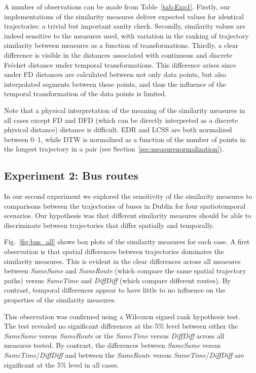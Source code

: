 \documentclass{interact}
\begin{document}
A number of observations can be made from Table~\ref{tab:Exp1}. Firstly, our implementations of the similarity measures deliver expected values for identical trajectories: a trivial but important sanity check. Secondly, similarity values are indeed sensitive to the measures used, with variation in the ranking of trajectory similarity between measures as a function of transformations. Thirdly, a clear difference is visible in the distances associated with continuous and discrete Fréchet distance under temporal transformations. This difference arises since under FD distances are calculated between not only data points, but also interpolated segments between these points, and thus the influence of the temporal transformation of the data points is limited.

Note that a physical interpretation of the meaning of the similarity measures in all cases except FD and DFD (which can be directly interpreted as a discrete physical distance) distance is difficult. EDR and LCSS are both normalized between 0--1, while DTW is normalized as a function of the number of points in the longest trajectory in a pair (see Section~\ref{sec:measurenormalization}).


\subsection{Experiment 2: Bus routes}
\label{par:result_2}
In our second experiment we explored the sensitivity of the similarity measures to comparisons between the trajectories of buses in Dublin for four spatiotemporal scenarios. Our hypothesis was that different similarity measures should be able to discriminate between trajectories that differ spatially and temporally.

Fig.~\ref{fig:bus_all} shows box plots of the similarity measures for each case. A first observation is that spatial differences between trajectories dominates the similarity measures. This is evident in the clear differences across all measures between \emph{SameSame} and \emph{SameRoute} (which compare the same spatial trajectory paths) versus \emph{SameTime} and \emph{DiffDiff} (which compare different routes). By contrast, temporal differences appear to have little to no influence on the properties of the similarity measures.

This observation was confirmed using a Wilcoxon signed rank hypothesis test. The test revealed no significant differences at the 5\% level between either the \textit{SameSame} versus \textit{SameRoute} or the \textit{SameTime} versus \textit{DiffDiff} across all measures tested. By contrast, the differences between \textit{SameSame} versus  \textit{SameTime}/\textit{DiffDiff} and between the \textit{SameRoute} versus  \textit{SameTime}/\textit{DiffDiff} are significant at the 5\% level in all cases.
\end{document}
